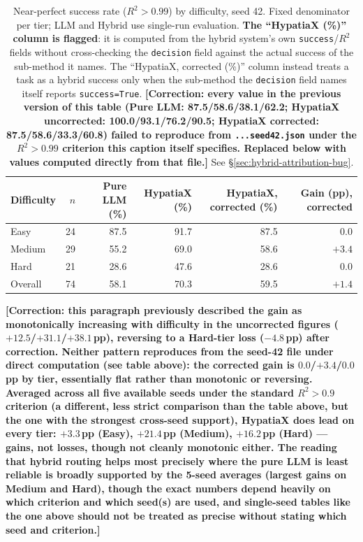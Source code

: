 \documentclass[twoside,11pt]{article}
\newcommand{\Rsq}{R^{2}}
\begin{document}
\begin{table}[h]
\centering
\caption{Near-perfect success rate ($\Rsq > 0.99$) by difficulty, seed 42.
Fixed denominator per tier; LLM and Hybrid use single-run evaluation.
\textbf{The ``HypatiaX (\%)'' column is flagged}: it is computed from the
hybrid system's own \texttt{success}/$\Rsq$ fields without cross-checking the
\texttt{decision} field against the actual success of the sub-method it
names. The ``HypatiaX, corrected (\%)'' column instead treats a task as a
hybrid success only when the sub-method the \texttt{decision} field names
itself reports \texttt{success=True}.
\textbf{[Correction: every value in the previous version of this table
(Pure LLM: 87.5/58.6/38.1/62.2; HypatiaX uncorrected:
100.0/93.1/76.2/90.5; HypatiaX corrected: 87.5/58.6/33.3/60.8) failed to
reproduce from \texttt{...seed42.json} under the $\Rsq>0.99$ criterion
this caption itself specifies. Replaced below with values computed
directly from that file.]} See \S\ref{sec:hybrid-attribution-bug}.}
\label{tab:difficulty}
\begin{tabular}{lrrrrr}
\toprule
Difficulty & $n$ & Pure LLM (\%) & HypatiaX (\%) & HypatiaX, corrected (\%) & Gain (pp), corrected \\
\midrule
Easy       & 24  & 87.5          & 91.7 & 87.5 & $0.0$ \\
Medium     & 29  & 55.2          & 69.0  & 58.6 & $+3.4$ \\
Hard       & 21  & 28.6          & 47.6  & 28.6 & $0.0$ \\
\midrule
Overall    & 74  & 58.1          & 70.3  & 59.5 & $+1.4$ \\
\bottomrule
\end{tabular}
\end{table}

\textbf{[Correction: this paragraph previously described the gain as
monotonically increasing with difficulty in the uncorrected figures
($+12.5$/$+31.1$/$+38.1$\,pp), reversing to a Hard-tier loss
($-4.8$\,pp) after correction. Neither pattern reproduces from the
seed-42 file under direct computation (see table above): the corrected
gain is $0.0$/$+3.4$/$0.0$\,pp by tier, essentially flat rather than
monotonic or reversing. Averaged across all five available seeds under
the standard $\Rsq>0.9$ criterion (a different, less strict comparison
than the table above, but the one with the strongest cross-seed
support), HypatiaX does lead on every tier: $+3.3$\,pp (Easy),
$+21.4$\,pp (Medium), $+16.2$\,pp (Hard) --- gains, not losses, though
not cleanly monotonic either. The reading that hybrid routing helps
most precisely where the pure LLM is least reliable is broadly
supported by the 5-seed averages (largest gains on Medium and Hard),
though the exact numbers depend heavily on which criterion and which
seed(s) are used, and single-seed tables like the one above should not
be treated as precise without stating which seed and criterion.]}
\end{document}
